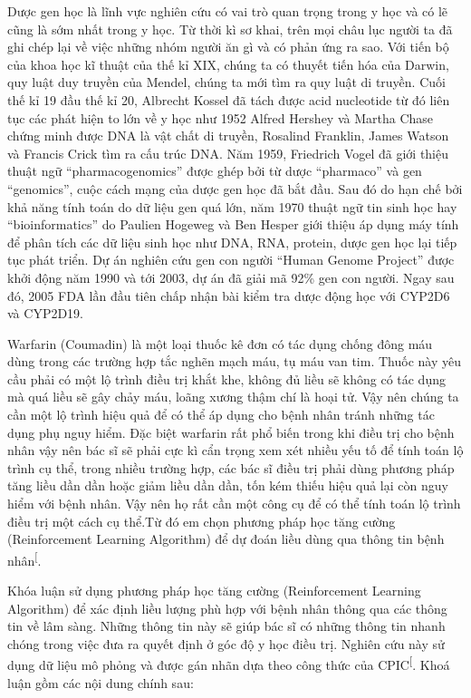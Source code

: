 \documentclass[14pt,oneside]{scrbook}
\begin{document}
Dược gen học là lĩnh vực nghiên cứu có vai trò quan trọng trong y học và
có lẽ cũng là sớm nhất trong y học. Từ thời kì sơ khai, trên mọi châu
lục người ta đã ghi chép lại về việc những nhóm người ăn gì và có phản
ứng ra sao. Với tiến bộ của khoa học kĩ thuật của thế kỉ XIX, chúng ta
có thuyết tiến hóa của Darwin, quy luật duy truyền của Mendel, chúng ta
mới tìm ra quy luật di truyền. Cuối thế kỉ 19 đầu thế kỉ 20, Albrecht
Kossel đã tách được acid nucleotide từ đó liên tục các phát hiện to lớn
về y học như 1952 Alfred Hershey và Martha Chase chứng minh được DNA là
vật chất di truyền, Rosalind Franklin, James Watson và Francis Crick tìm
ra cấu trúc DNA. Năm 1959, Friedrich Vogel đã giới thiệu thuật ngữ
``pharmacogenomics'' được ghép bởi từ dược ``pharmaco'' và gen
``genomics'', cuộc cách mạng của dược gen học đã bắt đầu. Sau đó do hạn
chế bởi khả năng tính toán do dữ liệu gen quá lớn, năm 1970 thuật ngữ
tin sinh học hay ``bioinformatics'' do Paulien Hogeweg và Ben Hesper
giới thiệu áp dụng máy tính để phân tích các dữ liệu sinh học như DNA,
RNA, protein, dược gen học lại tiếp tục phát triển. Dự án nghiên cứu gen
con người ``Human Genome Project'' được khởi động năm 1990 và tới 2003,
dự án đã giải mã 92\% gen con người. Ngay sau đó, 2005 FDA lần đầu tiên
chấp nhận bài kiểm tra dược động học với CYP2D6 và CYP2D19.

Warfarin (Coumadin) là một loại thuốc kê đơn có tác dụng chống đông máu
dùng trong các trường hợp tắc nghẽn mạch máu, tụ máu van tim. Thuốc này
yêu cầu phải có một lộ trình điều trị khắt khe, không đủ liều sẽ không
có tác dụng mà quá liều sẽ gây chảy máu, loãng xương thậm chí là hoại
tử. Vậy nên chúng ta cần một lộ trình hiệu quả để có thể áp dụng cho
bệnh nhân tránh những tác dụng phụ nguy hiểm. Đặc biệt warfarin rất phổ
biến trong khi điều trị cho bệnh nhân vậy nên bác sĩ sẽ phải cực kì cẩn
trọng xem xét nhiều yếu tố để tính toán lộ trình cụ thể, trong nhiều
trường hợp, các bác sĩ điều trị phải dùng phương pháp tăng liều dần dần
hoặc giảm liều dần dần, tốn kém thiếu hiệu quả lại còn nguy hiểm với
bệnh nhân. Vậy nên họ rất cần một công cụ để có thể tính toán lộ trình
điều trị một cách cụ thể.Từ đó em chọn phương pháp học tăng cường
(Reinforcement Learning Algorithm) để dự đoán liều dùng qua thông tin
bệnh nhân\textsuperscript{{[}\citeproc{ref-warfarin1}{1}{]}}.

Khóa luận sử dụng phương pháp học tăng cường (Reinforcement Learning
Algorithm) để xác định liều lượng phù hợp với bệnh nhân thông qua các
thông tin về lâm sàng. Những thông tin này sẽ giúp bác sĩ có những thông
tin nhanh chóng trong việc đưa ra quyết định ở góc độ y học điều trị.
Nghiên cứu này sử dụng dữ liệu mô phỏng và được gán nhãn dựa theo công
thức của CPIC\textsuperscript{{[}\citeproc{ref-cpic}{2}{]}}. Khoá luận
gồm các nội dung chính sau:
\end{document}

